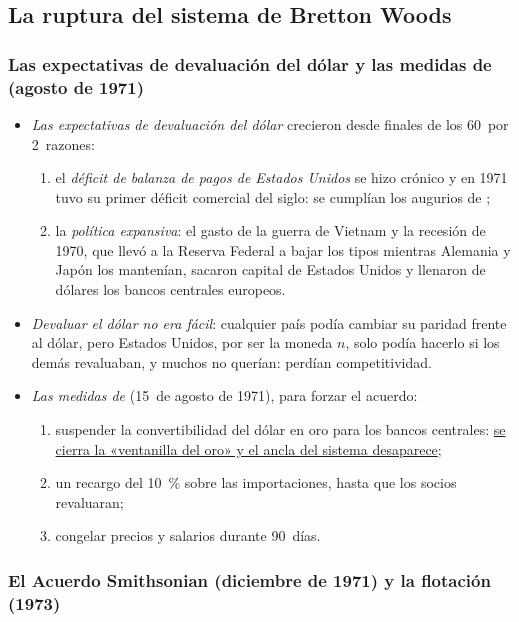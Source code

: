 \documentclass[11pt]{article}
\begin{document}
\subsection{La ruptura del sistema de Bretton Woods}\label{sec:ruptura}

\subsubsection{Las expectativas de devaluación del dólar\cortetitulo{} y las medidas de  (agosto de 1971)}

\begin{itemize}
\item \emph{Las expectativas de devaluación del dólar} crecieron desde finales de los 60~por 2~razones:
  \begin{enumerate}
  \item el \emph{déficit de balanza de pagos de Estados Unidos} se hizo crónico y en 1971 tuvo su primer déficit comercial del siglo: se cumplían los augurios de ;
  \item la \emph{política expansiva}: el gasto de la guerra de Vietnam y la recesión de 1970, que llevó a la Reserva Federal a bajar los tipos mientras Alemania y Japón los mantenían, sacaron capital de Estados Unidos y llenaron de dólares los bancos centrales europeos.
  \end{enumerate}
\item \emph{Devaluar el dólar no era fácil}: cualquier país podía cambiar su paridad frente al dólar, pero Estados Unidos, por ser la moneda $n$, solo podía hacerlo si los demás revaluaban, y muchos no querían: perdían competitividad.
\item \emph{Las medidas de } (15~de agosto de 1971), para forzar el acuerdo\nocite{FedHistory2026Convertibilidad}:
  \begin{enumerate}
  \item suspender la convertibilidad del dólar en oro para los bancos centrales: \uline{se cierra la «ventanilla del oro» y el ancla del sistema desaparece};
  \item un recargo del 10~\% sobre las importaciones, hasta que los socios revaluaran;
  \item congelar precios y salarios durante 90~días.
  \end{enumerate}
\end{itemize}

\subsubsection{El Acuerdo Smithsonian (diciembre de 1971) y la flotación (1973)}
\end{document}
